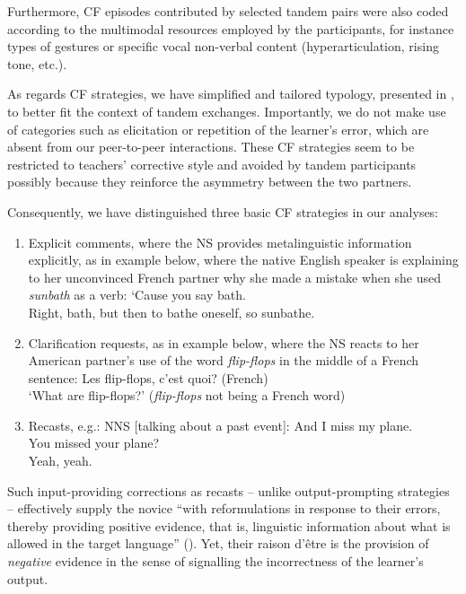 \documentclass[output=paper,colorlinks,citecolor=brown,modfonts,nonflat]{../langscibook}
\begin{document}
Furthermore, CF episodes contributed by selected tandem pairs were also coded according to the multimodal resources employed by the participants, for instance types of gestures or specific vocal non-verbal content (hyperarticulation, rising tone, etc.). 

As regards CF strategies, we have simplified and tailored  typology, presented in , to better fit the context of tandem exchanges. Importantly, we do not make use of categories such as elicitation or repetition of the learner’s error, which are absent from our peer-to-peer interactions. These CF strategies seem to be restricted to teachers’ corrective style and avoided by tandem participants possibly because they reinforce the asymmetry between the two partners. 

Consequently, we have distinguished three basic CF strategies in our analyses: 

\begin{enumerate}
\item Explicit comments, where the NS provides metalinguistic information explicitly, as in example  below, where the native English speaker is explaining to her unconvinced French partner why she made a mistake when she used \textit{sunbath} as a verb:
\ea\label{ex:scheuer:3}
{\NNS} {‘Cause} {you} {say} {bath.}\\
{\NS} {Right,} {bath,} {but} {then} {to} {bathe} {oneself,} {so} {sunbathe}.
\z

\item Clarification requests, as in example  below, where the NS reacts to her American partner’s use of the word \textit{flip-flops} in the middle of a French sentence:
\ea\label{ex:scheuer:4}
{\NS} {Les} {flip-flops,} {c’est} {quoi?}  (French)\\
‘What are flip-flops?’ (\textit{flip-flops} not being a French word)
\z

\item Recasts, e.g.:
\ea \label{ex:scheuer:5}
NNS [talking about a past event]:  {And}  {I}  {miss}  {my}  {plane}.\\
{\NS} {You} {missed} {your} {plane?}\\
{\NNS} {Yeah,} {yeah.}
\z
\end{enumerate}

Such input-providing corrections as recasts – unlike output-prompting strategies – effectively supply the novice “with reformulations in response to their errors, thereby providing positive evidence, that is, linguistic information about what is allowed in the target language” (\citealt[32]{SatoLoewen2019}). Yet, their raison d’être is the provision of \textit{negative} evidence in the sense of signalling the incorrectness of the learner’s output.
\end{document}
